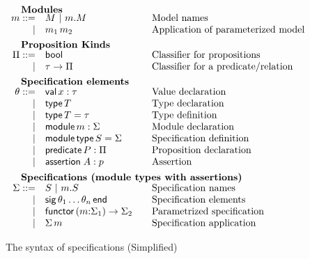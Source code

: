 \begin{figure}
\[\begin{array}{rl@{\qquad}l}
    \noalign{\textbf{Modules}}		
    \om ::= 
    & \oM  \obar \oselect{\om}{\oM}&\mbox{Model names}\\
    | & \oapp{\om_1}{\om_2}&\mbox{Application of parameterized model}\\[5pt]
    
    \noalign{\textbf{Proposition Kinds}}
    \opt ::=
    & \oProp & \mbox{Classifier for propositions}\\
    |& \oarrow{\oty}{\opt} & \mbox{Classifier for a predicate/relation}\\[5pt] 
    
    \noalign{\textbf{Specification elements}}
    \ote ::=
    & \ovalspec{\ox}{\oty}&\mbox{Value declaration}\\
    | & \otyspec{\oTY}&\mbox{Type declaration}\\
    | & \otydef{\oTY}{\oty}&\mbox{Type definition}\\
    | & \omodulespec{\om}{\omt}&\mbox{Module declaration}\\
    | & \osignatdef{\oMT}{\omt}&\mbox{Specification definition}\\
    | & \opropspec{\oP}{\opt}&\mbox{Proposition declaration}\\
    | & \oassertion{\oA}{\op}&\mbox{Assertion}\\[5pt]

    \noalign{\textbf{Specifications (module types with assertions)}}
    \omt ::= 
    & \oMT \obar \oselect{\om}{\oMT} & \mbox{Specification names}\\
    | & \osig{\ote_1 \ldots \ote_n} & \mbox{Specification elements}\\
    | & \ofunctor{\om}{\omt_1}{\omt_2} & \mbox{Parametrized specification}\\
    | & \oapp{\omt}{\om} & \mbox{Specification application}
  \end{array}
  \]
  \label{fig:input}
  \caption{The syntax of specifications (Simplified)}
\end{figure}

